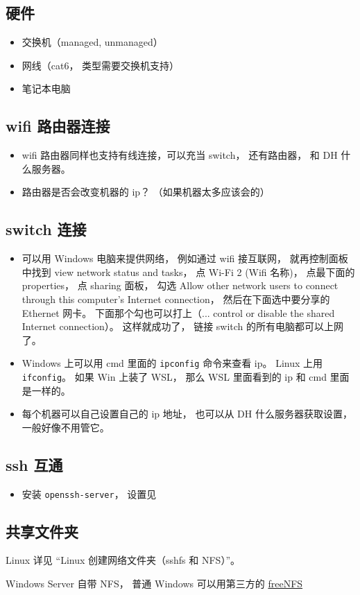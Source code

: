 
\begin{issues}
\issueDraft
\end{issues}

\subsection{硬件}
\begin{itemize}
\item 交换机（managed, unmanaged）
\item 网线（cat6， 类型需要交换机支持）
\item 笔记本电脑
\end{itemize}

\subsection{wifi 路由器连接}
\begin{itemize}
\item wifi 路由器同样也支持有线连接，可以充当 switch， 还有路由器， 和 DH 什么服务器。
\item 路由器是否会改变机器的 ip？ （如果机器太多应该会的）
\end{itemize}

\subsection{switch 连接}
\begin{itemize}
\item 可以用 Windows 电脑来提供网络， 例如通过 wifi 接互联网， 就再控制面板中找到 view network status and tasks， 点 Wi-Fi 2 (Wifi 名称)， 点最下面的 properties， 点 sharing 面板， 勾选 Allow other network users to connect through this computer's Internet connection， 然后在下面选中要分享的 Ethernet 网卡。 下面那个勾也可以打上（... control or disable the shared Internet connection）。 这样就成功了， 链接 switch 的所有电脑都可以上网了。
\item Windows 上可以用 cmd 里面的 \verb|ipconfig| 命令来查看 ip。 Linux 上用 \verb|ifconfig|。 如果 Win 上装了 WSL， 那么 WSL 里面看到的 ip 和 cmd 里面是一样的。
\item 每个机器可以自己设置自己的 ip 地址， 也可以从 DH 什么服务器获取设置， 一般好像不用管它。
\end{itemize}

\subsection{ssh 互通}
\begin{itemize}
\item 安装 \verb|openssh-server|， 设置见
\end{itemize}

\subsection{共享文件夹}
Linux 详见 “Linux 创建网络文件夹（sshfs 和 NFS）”。

Windows Server 自带 NFS， 普通 Windows 可以用第三方的 \href{https://sourceforge.net/projects/freenfs/files/latest/download}{freeNFS}
